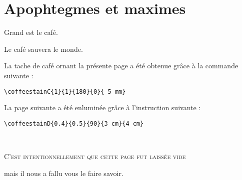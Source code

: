 \documentclass[a4paper, 11pt, BCOR = 0 pt, DIV = 13, oneside, french]{scrartcl}
\begin{document}
\section{Apophtegmes et maximes}
\noindent
Grand est le café.

\vspace{5mm}

\noindent
Le café sauvera le monde.

\vfill{}

\begin{tcolorbox}
  La tache de café ornant la présente page a été obtenue grâce à la commande suivante :

  \verb|\coffeestainC{1}{1}{180}{0}{-5 mm}|
\end{tcolorbox}

\begin{tcolorbox}
La page suivante a été enluminée grâce à l'instruction suivante :

  \verb|\coffeestainD{0.4}{0.5}{90}{3 cm}{4 cm}|
\end{tcolorbox}

\newpage{}
\pagestyle{empty}
~\\

\label{stainD}

\vfill{}
\begin{center}
\textsc{C'est intentionnellement que cette page fut laissée vide}

mais il nous a fallu vous le faire savoir.
\end{center}

\vfill{}
\end{document}

